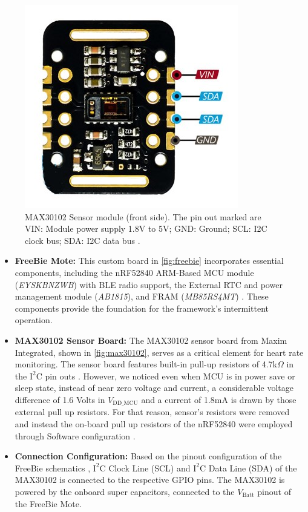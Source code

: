 \begin{figure}[t]
    \centering
    \includegraphics[width=0.4\linewidth]{chapters/Implementation/MAX30102.jpg}
    \caption{MAX30102 Sensor module (front side). The pin out marked are VIN: Module power supply 1.8V to 5V; GND: Ground; SCL: I2C clock bus; SDA: I2C data bus \cite{max30102pinout}.}
    \label{fig:max30102}
\end{figure}

\begin{itemize}
    \item \textbf{FreeBie Mote:} This custom board in \autoref{fig:freebie} incorporates essential components, including the nRF52840 ARM-Based MCU module (\textit{EYSKBNZWB}) with BLE radio support, the External RTC and power management module (\textit{AB1815}), and FRAM (\textit{MB85RS4MT}) \cite{de2022Intermittently}. These components provide the foundation for the framework's intermittent operation.
    
    \item \textbf{MAX30102 Sensor Board:} The MAX30102 sensor board from Maxim Integrated, shown in \autoref{fig:max30102}, serves as a critical element for heart rate monitoring. The sensor board features built-in pull-up resistors of 4.7k\(\Omega\) in the \(\text{I}^2\text{C}\) pin outs \cite{2018MAX30102}. However, we noticed even when MCU is in power save or sleep state, instead of near zero voltage and current, a considerable voltage difference of 1.6 Volts in $V_{\text{DD\_MCU}}$ and a current of 1.8mA is drawn by those external pull up resistors. For that reason, sensor's resistors were removed and instead the on-board pull up resistors of the nRF52840 were employed through Software configuration \cite{2021nrf52840pullup}.
    
    \item \textbf{Connection Configuration:} Based on the pinout configuration of the FreeBie schematics \cite{FreebieGithub},  \(\text{I}^2\text{C}\) Clock Line (SCL) and \(\text{I}^2\text{C}\) Data Line (SDA) of the MAX30102 is connected to the respective GPIO pins. The MAX30102 is powered by the onboard super capacitors, connected to the $V_{\text{Batt}}$ pinout of the FreeBie Mote.
\end{itemize}

